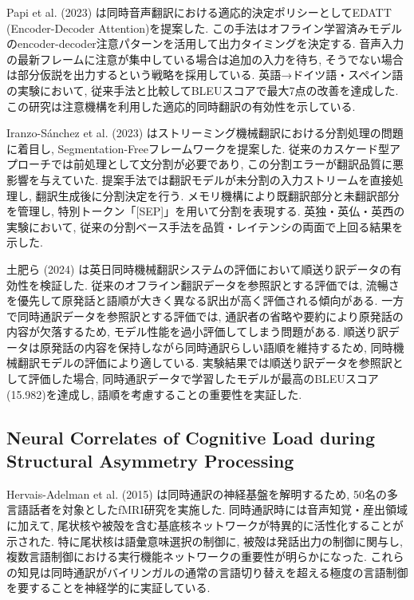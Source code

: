 Papi et al. (2023) \cite{papi2023attention}は同時音声翻訳における適応的決定ポリシーとしてEDATT (Encoder-Decoder Attention)を提案した.
この手法はオフライン学習済みモデルのencoder-decoder注意パターンを活用して出力タイミングを決定する.
音声入力の最新フレームに注意が集中している場合は追加の入力を待ち, そうでない場合は部分仮説を出力するという戦略を採用している.
英語→ドイツ語・スペイン語の実験において, 従来手法と比較してBLEUスコアで最大7点の改善を達成した.
この研究は注意機構を利用した適応的同時翻訳の有効性を示している.

Iranzo-Sánchez et al. (2023) \cite{iranzo2023segmentation}はストリーミング機械翻訳における分割処理の問題に着目し, Segmentation-Freeフレームワークを提案した.
従来のカスケード型アプローチでは前処理として文分割が必要であり, この分割エラーが翻訳品質に悪影響を与えていた.
提案手法では翻訳モデルが未分割の入力ストリームを直接処理し, 翻訳生成後に分割決定を行う.
メモリ機構により既翻訳部分と未翻訳部分を管理し, 特別トークン「[SEP]」を用いて分割を表現する.
英独・英仏・英西の実験において, 従来の分割ベース手法を品質・レイテンシの両面で上回る結果を示した.

土肥ら (2024) \cite{doi2024evaluation}は英日同時機械翻訳システムの評価において順送り訳データの有効性を検証した.
従来のオフライン翻訳データを参照訳とする評価では, 流暢さを優先して原発話と語順が大きく異なる訳出が高く評価される傾向がある.
一方で同時通訳データを参照訳とする評価では, 通訳者の省略や要約により原発話の内容が欠落するため, モデル性能を過小評価してしまう問題がある.
順送り訳データは原発話の内容を保持しながら同時通訳らしい語順を維持するため, 同時機械翻訳モデルの評価により適している.
実験結果では順送り訳データを参照訳として評価した場合, 同時通訳データで学習したモデルが最高のBLEUスコア(15.982)を達成し, 語順を考慮することの重要性を実証した.



\subsection{Neural Correlates of Cognitive Load during Structural Asymmetry Processing}

Hervais-Adelman et al. (2015) \cite{hervais2015fmri}は同時通訳の神経基盤を解明するため, 50名の多言語話者を対象としたfMRI研究を実施した.
同時通訳時には音声知覚・産出領域に加えて, 尾状核や被殻を含む基底核ネットワークが特異的に活性化することが示された.
特に尾状核は語彙意味選択の制御に, 被殻は発話出力の制御に関与し, 複数言語制御における実行機能ネットワークの重要性が明らかになった.
これらの知見は同時通訳がバイリンガルの通常の言語切り替えを超える極度の言語制御を要することを神経学的に実証している.

